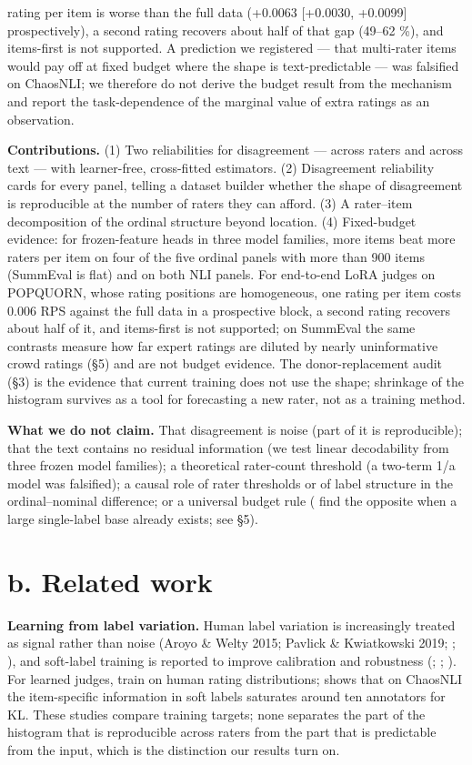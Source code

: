 \documentclass[10pt]{article}
\begin{document}
rating per item is worse than the full data (+0.0063 {[}+0.0030, +0.0099{]} prospectively), a second rating recovers about half of that gap (49--62 \%), and items-first is not supported. A prediction we registered --- that multi-rater items would pay off at fixed budget where the shape is text-predictable --- was falsified on ChaosNLI; we therefore do not derive the budget result from the mechanism and report the task-dependence of the marginal value of extra ratings as an observation.

\textbf{Contributions.} (1) Two reliabilities for disagreement --- across raters and across text --- with learner-free, cross-fitted estimators. (2) Disagreement reliability cards for every panel, telling a dataset builder whether the shape of disagreement is reproducible at the number of raters they can afford. (3) A rater--item decomposition of the ordinal structure beyond location. (4) Fixed-budget evidence: for frozen-feature heads in three model families, more items beat more raters per item on four of the five ordinal panels with more than 900 items (SummEval is flat) and on both NLI panels. For end-to-end LoRA judges on POPQUORN, whose rating positions are homogeneous, one rating per item costs 0.006 RPS against the full data in a prospective block, a second rating recovers about half of it, and items-first is not supported; on SummEval the same contrasts measure how far expert ratings are diluted by nearly uninformative crowd ratings (\S{}5) and are not budget evidence. The donor-replacement audit (\S{}3) is the evidence that current training does not use the shape; shrinkage of the histogram survives as a tool for forecasting a new rater, not as a training method.

\textbf{What we do not claim.} That disagreement is noise (part of it is reproducible); that the text contains no residual information (we test linear decodability from three frozen model families); a theoretical rater-count threshold (a two-term 1/a model was falsified); a causal role of rater thresholds or of label structure in the ordinal--nominal difference; or a universal budget rule (\citet{zhang2021learning} find the opposite when a large single-label base already exists; see \S{}5).

\section{b. Related work}

\textbf{Learning from label variation.} Human label variation is increasingly treated as signal rather than noise (Aroyo \& Welty 2015; Pavlick \& Kwiatkowski 2019; \citealp{uma2021learning}; \citealp{plank2022problem}), and soft-label training is reported to improve calibration and robustness (\citealp{peterson2019human}; \citealp{collins2022eliciting}; \citealp{singh2025distributions}). For learned judges, \citet{chen2025beyond} train on human rating distributions; \citet{kohli2026metric} shows that on ChaosNLI the item-specific information in soft labels saturates around ten annotators for KL. These studies compare training targets; none separates the part of the histogram that is reproducible across raters from the part that is predictable from the input, which is the distinction our results turn on.
\end{document}
